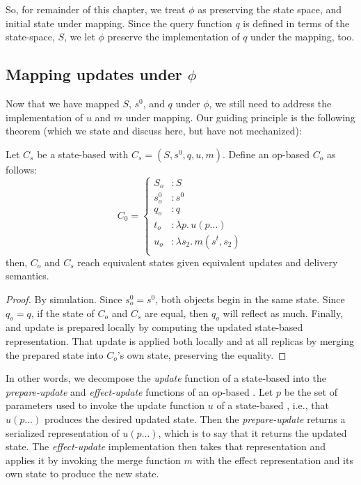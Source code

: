 So, for remainder of this chapter, we treat $\phi$ as preserving the state
space, and initial state under mapping. Since the query function $q$ is defined
in terms of the state-space, $S$, we let $\phi$ preserve the implementation of
$q$ under the mapping, too.

\subsection{Mapping updates under $\phi$}
Now that we have mapped $S$, $s^0$, and $q$ under $\phi$, we still need to
address the implementation of $u$ and $m$ under mapping. Our guiding principle
is the following theorem (which we state and discuss here, but have not
mechanized):
\begin{theorem}
  Let $C_s$ be a state-based \CRDT with $C_s = (S, s^0, q, u, m)$. Define an
  op-based \CRDT $C_o$ as follows:
  \[
    C_0 = \left\{ \begin{aligned}
      S_o &: S \\
      s^0_o &: s^0 \\
      q_o &: q \\
      t_o &: \lambda p.\, u(p...) \\
      u_o &: \lambda s_2.\, m(s^t, s_2) \\
    \end{aligned} \right.
  \]
  then, $C_o$ and $C_s$ reach equivalent states given equivalent updates and
  delivery semantics.
\end{theorem}
\begin{proof}
By simulation. Since $s^0_o = s^0$, both objects begin in the same state. Since
$q_o = q$, if the state of $C_o$ and $C_s$ are equal, then $q_o$ will reflect as
much. Finally, and update is prepared locally by computing the updated
state-based representation. That update is applied both locally and at all
replicas by merging the prepared state into $C_o$'s own state, preserving the
equality.
\end{proof}

In other words, we decompose the \textit{update} function of a state-based \CRDT
into the \textit{prepare-update} and \textit{effect-update} functions of an
op-based \CRDT. Let $p$ be the set of parameters used to invoke the update
function $u$ of a state-based \CRDT, i.e., that $u(p...)$ produces the desired
updated state. Then the \textit{prepare-update} returns a serialized
representation of $u(p...)$, which is to say that it returns the updated state.
The \textit{effect-update} implementation then takes that representation and
applies it by invoking the merge function $m$ with the effect representation and
its own state to produce the new state.

